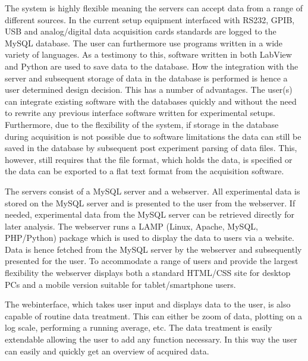 The system is highly flexible meaning the servers can accept data from
a range of different sources. In the current setup equipment
interfaced with RS232, GPIB, USB and analog/digital data acquisition
cards standards are logged to the MySQL database. The user can
furthermore use programs written in a wide variety of languages. As a
testimony to this, software written in both LabView and Python are
used to save data to the database. How the integration with the server
and subsequent storage of data in the database is performed is hence a
user determined design decision. This has a number of advantages.  The
user(s) can integrate existing software with the databases quickly and
without the need to rewrite any previous interface software written
for experimental setups. Furthermore, due to the flexibility of
the system, if storage in the database during acquisition is not
possible due to software limitations the data can still be saved in
the database by subsequent post experiment parsing of data files. This,
however, still requires that the file format, which holds the data, is
specified or the data can be exported to a flat text format from the
acquisition software.

The servers consist of a MySQL server and a webserver. All experimental data is
stored on the MySQL server and is presented to the user from the webserver. If
needed, experimental data from the MySQL server can be retrieved directly for
later analysis. The webserver runs a LAMP (Linux, Apache, MySQL,
PHP/Python) package which is used to display the data to users via
a website. Data is hence fetched from the MySQL server by the webserver and
subsequently presented for the user. To accommodate a range of users and
provide the largest flexibility the webserver displays both a standard HTML/CSS
site for desktop PCs and a mobile version suitable for tablet/smartphone users.

The webinterface, which takes user input and displays data to the
user, is also capable of routine data treatment. This can either be
zoom of data, plotting on a log scale, performing a running average,
etc. The data treatment is easily extendable allowing the user to add
any function necessary. In this way the user can easily and quickly
get an overview of acquired data.
